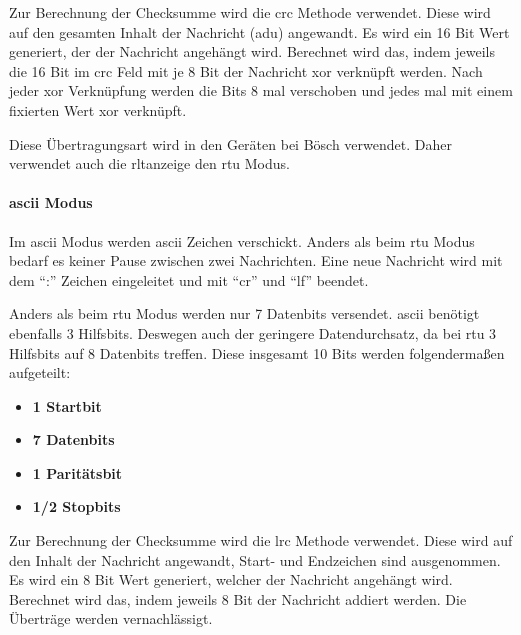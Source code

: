Zur Berechnung der Checksumme wird die \acf{crc} Methode verwendet. Diese wird auf den gesamten Inhalt der Nachricht (\acs{adu}) angewandt. Es wird ein 16 Bit Wert generiert, der der Nachricht angehängt wird. Berechnet wird das, indem jeweils die 16 Bit im \acs{crc} Feld mit je 8 Bit der Nachricht \gls{xor} verknüpft werden. Nach jeder \gls{xor} Verknüpfung werden die Bits 8 mal verschoben und jedes mal mit einem fixierten Wert \gls{xor} verknüpft. 

Diese Übertragungsart wird in den Geräten bei Bösch verwendet. Daher verwendet auch die \acs{rltanzeige} den \acs{rtu} Modus.

\paragraph{\acs{ascii} Modus}
Im \acs{ascii} Modus werden \acs{ascii} Zeichen verschickt. Anders als beim \acs{rtu} Modus bedarf es keiner Pause zwischen zwei Nachrichten. Eine neue Nachricht wird mit dem \enquote{:} Zeichen eingeleitet und mit \enquote{\gls{cr}} und \enquote{\gls{lf}} beendet.

Anders als beim \acs{rtu} Modus werden nur 7 Datenbits versendet. \acs{ascii} benötigt ebenfalls 3 Hilfsbits. Deswegen auch der geringere Datendurchsatz, da bei \acs{rtu} 3 Hilfsbits auf 8 Datenbits treffen. Diese insgesamt 10 Bits werden folgendermaßen aufgeteilt:
\begin{itemize}
	\item \textbf{1 Startbit}
	\item \textbf{7 Datenbits}
	\item \textbf{1 Paritätsbit}
	\item \textbf{1/2 Stopbits}
\end{itemize}

Zur Berechnung der Checksumme wird die \acf{lrc} Methode verwendet. Diese wird auf den Inhalt der Nachricht angewandt, Start- und Endzeichen sind ausgenommen. Es wird ein 8 Bit Wert generiert, welcher der Nachricht angehängt wird. Berechnet wird das, indem jeweils 8 Bit der Nachricht addiert werden. Die Überträge werden vernachlässigt.

